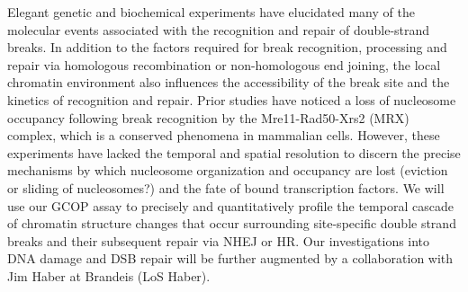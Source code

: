 {}
Elegant genetic and biochemical experiments have elucidated many of the molecular events associated with the recognition and repair of  double-strand breaks\citep{Haber2016-ca,Lieber2010-cl,Renkawitz2014-jz,Jasin2013-fv}.  In addition to the factors required for break recognition, processing and repair via homologous recombination or non-homologous end joining, the local chromatin environment also influences the accessibility of the break site
and the kinetics of recognition and repair\citep{Price2013-lp,Smerdon1991-sv}. Prior studies have noticed a loss of nucleosome occupancy following break recognition by the Mre11-Rad50-Xrs2 (MRX) complex\citep{Tsukuda2005-bm}, which is a conserved phenomena in mammalian cells\citep{Berkovich2007-it,Goldstein2013-kb}. However, these experiments have lacked the temporal and spatial resolution to discern the precise mechanisms by which nucleosome organization and occupancy are lost (\eg eviction or sliding of nucleosomes?) and the fate of bound transcription factors.  We will use our GCOP assay to precisely and quantitatively profile the temporal cascade of chromatin structure changes that occur surrounding site-specific double strand breaks and their subsequent repair via NHEJ or HR. Our investigations into DNA damage and DSB repair will be further augmented by a collaboration with Jim Haber at Brandeis (LoS Haber). %


